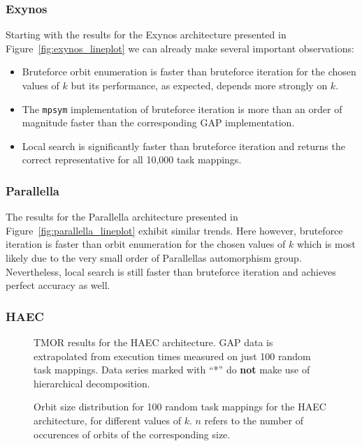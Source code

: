\subsubsection{Exynos}

Starting with the results for the Exynos architecture presented in
Figure~\ref{fig:exynos_lineplot} we can already make several important
observations:
%
\begin{itemize}
  \item Bruteforce orbit enumeration is faster than bruteforce iteration for
        the chosen values of $k$ but its performance, as expected, depends
        more strongly on $k$.
  \item The \texttt{mpsym} implementation of bruteforce iteration is more than an
        order of magnitude faster than the corresponding GAP implementation.
  \item Local search is significantly faster than bruteforce iteration and
        returns the correct representative for all 10,000 task mappings.
\end{itemize}

\subsubsection{Parallella}

The results for the Parallella architecture presented in
Figure~\ref{fig:parallella_lineplot} exhibit similar trends. Here however,
bruteforce iteration is faster than orbit enumeration for the chosen
values of $k$ which is most likely due to the very small order of Parallellas
automorphism group. Nevertheless, local search is still faster than bruteforce
iteration and achieves perfect accuracy as well.

\subsubsection{HAEC}

\begin{figure}
  \centering
  \caption{TMOR results for the HAEC architecture. GAP data is extrapolated
           from execution times measured on just 100 random task mappings.
           Data series marked with ``*'' do \textbf{not} make use of
           hierarchical decomposition.}
  \label{fig:haec_lineplot}
  \vspace{1cm}
  \caption{Orbit size distribution for 100 random task mappings for the HAEC
           architecture, for different values of $k$. $n$ refers to the number
           of occurences of orbits of the corresponding size.}
  \label{fig:haec_histogram}
\end{figure}

